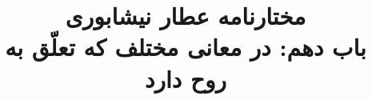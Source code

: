 \documentclass[14pt,b5paper]{article}
\begin{document}
\title{\Huge مختارنامه عطار نیشابوری \\
باب دهم: در معانی مختلف که تعلّق به روح دارد}
\author{ }
\date{ }
\maketitle
\newpage
\tableofcontents
\newpage

\newpage

\newpage

\newpage

\newpage

\newpage

\newpage

\newpage

\newpage

\newpage

\newpage

\newpage

\newpage

\newpage

\newpage

\newpage

\newpage

\newpage

\newpage

\newpage

\newpage

\newpage

\newpage

\newpage

\newpage

\newpage

\newpage

\newpage

\newpage

\newpage

\newpage

\newpage

\newpage

\newpage

\newpage

\newpage

\newpage

\newpage

\newpage

\newpage

\newpage

\newpage

\newpage

\newpage

\newpage
\end{document}

